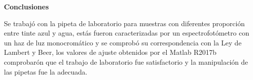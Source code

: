 \textbf{\textcolor{azul50}{Conclusiones}}

Se trabajó con la pipeta de laboratorio para muestras con diferentes proporción entre tinte azul y agua, estás fueron caracterizadas por un espectrofotómetro con un haz de luz monocromático y se comprobó su correspondencia con la Ley de Lambert y Beer, los valores de ajuste obtenidos por el Matlab R2017b comprobarón que el trabajo de laboratorio fue satisfactorio y la manipulación de las pipetas fue la adecuada.

























